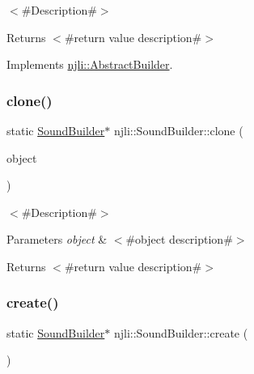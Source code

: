 $<$\#\+Description\#$>$

\begin{DoxyReturn}{Returns}
$<$\#return value description\#$>$ 
\end{DoxyReturn}


Implements \mbox{\hyperlink{classnjli_1_1_abstract_builder_aa1d220053e182c37b31b427499c6eacf}{njli\+::\+Abstract\+Builder}}.

\mbox{\label{classnjli_1_1_sound_builder_a99b6adfe180d217ad5076f53dce2462a}} 
\subsubsection{\texorpdfstring{clone()}{clone()}}
{\footnotesize\ttfamily static \mbox{\hyperlink{classnjli_1_1_sound_builder}{Sound\+Builder}}$\ast$ njli\+::\+Sound\+Builder\+::clone (\begin{DoxyParamCaption}\item[{const \mbox{\hyperlink{classnjli_1_1_sound_builder}{Sound\+Builder}} \&}]{object }\end{DoxyParamCaption})\hspace{0.3cm}{\ttfamily [static]}}

$<$\#\+Description\#$>$


\begin{DoxyParams}{Parameters}
{\em object} & $<$\#object description\#$>$\\
\hline
\end{DoxyParams}
\begin{DoxyReturn}{Returns}
$<$\#return value description\#$>$ 
\end{DoxyReturn}
\mbox{\label{classnjli_1_1_sound_builder_ac8f14144f6c578259789d003647e006c}} 
\subsubsection{\texorpdfstring{create()}{create()}}
{\footnotesize\ttfamily static \mbox{\hyperlink{classnjli_1_1_sound_builder}{Sound\+Builder}}$\ast$ njli\+::\+Sound\+Builder\+::create (\begin{DoxyParamCaption}{ }\end{DoxyParamCaption})\hspace{0.3cm}{\ttfamily [static]}}

